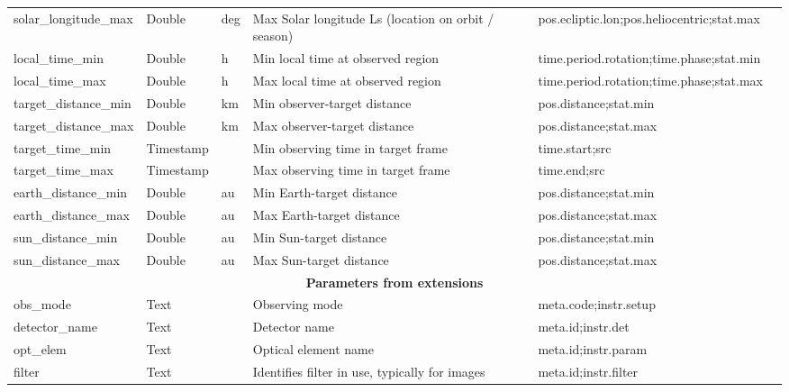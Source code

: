 \documentclass[11pt,a4paper]{ivoa}
\begin{document}
\begin{landscape}
\begin{longtable}{p{3.5cm}p{0.5cm}p{1.4cm}p{1cm}p{7cm}p{5cm}}
solar\_longitude\_max&Double&deg&Max Solar longitude Ls (location on orbit / season)&pos.ecliptic.lon;pos.heliocentric;stat.max &\\

local\_time\_min&Double&h&Min local time at observed region&time.period.rotation;time.phase;stat.min&\\

local\_time\_max&Double&h&Max local time at observed region&time.period.rotation;time.phase;stat.max &\\

target\_distance\_min&Double&km&Min observer-target distance&pos.distance;stat.min&\\

target\_distance\_max&Double&km&Max observer-target distance&pos.distance;stat.max&\\

target\_time\_min&Timestamp&&Min observing time in target frame&time.start;src&\\

target\_time\_max&Timestamp&&Max observing time in target frame&time.end;src&\\

earth\_distance\_min&Double&au&Min Earth-target distance&pos.distance;stat.min&\\

earth\_distance\_max&Double&au&Max Earth-target distance&pos.distance;stat.max&\\

sun\_distance\_min&Double&au&Min Sun-target distance&pos.distance;stat.min&\\

sun\_distance\_max&Double&au&Max Sun-target distance&pos.distance;stat.max&\\

\multicolumn{6}{c}{\vrule width 0pt height 20pt depth 12pt \textbf{\textbf{Parameters from extensions}}}\\

obs\_mode&Text&&Observing mode&meta.code;instr.setup&\\

detector\_name&Text&&Detector name&meta.id;instr.det&\\

opt\_elem&Text&&Optical element name&meta.id;instr.param&\\

filter&Text& &Identifies filter in use, typically for images&meta.id;instr.filter&\\


\end{longtable}
\end{landscape}
\end{document}
